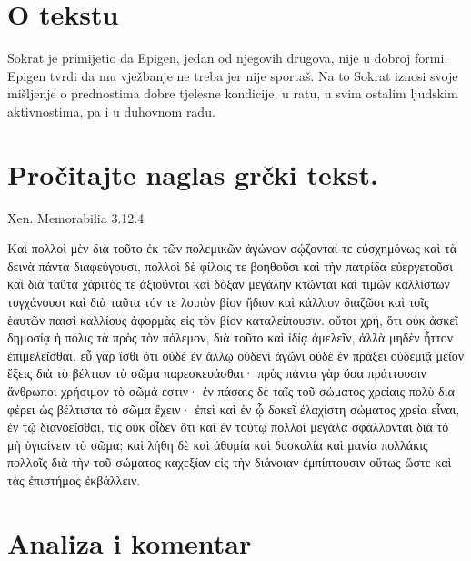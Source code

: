 


\section*{O tekstu}

Sokrat je primijetio da Epigen, jedan od njegovih drugova, nije u dobroj formi. Epigen tvrdi da mu vježbanje ne treba jer nije sportaš. Na to Sokrat iznosi svoje mišljenje o prednostima dobre tjelesne kondicije, u ratu, u svim ostalim ljudskim aktivnostima, pa i u duhovnom radu.


\section*{Pročitajte naglas grčki tekst.}
Xen. Memorabilia 3.12.4

\medskip

{\large
\begin{greek}

\noindent Καὶ πολλοὶ μὲν διὰ τοῦτο ἐκ τῶν πολεμικῶν ἀγώνων σῴζονταί τε εὐσχημόνως καὶ τὰ δεινὰ πάντα διαφεύγουσι, πολλοὶ δὲ φίλοις τε βοηθοῦσι καὶ τὴν πατρίδα εὐεργετοῦσι καὶ διὰ ταῦτα χάριτός τε ἀξιοῦνται καὶ δόξαν μεγάλην κτῶνται καὶ τιμῶν καλλίστων τυγχάνουσι καὶ διὰ ταῦτα τόν τε λοιπὸν βίον ἥδιον καὶ κάλλιον διαζῶσι καὶ τοῖς ἑαυτῶν παισὶ καλλίους ἀφορμὰς εἰς τὸν βίον καταλείπουσιν. οὔτοι χρή, ὅτι οὐκ ἀσκεῖ δημοσίᾳ ἡ πόλις τὰ πρὸς τὸν πόλεμον, διὰ τοῦτο καὶ ἰδίᾳ ἀμελεῖν, ἀλλὰ μηδὲν ἧττον ἐπιμελεῖσθαι. εὖ γὰρ ἴσθι ὅτι οὐδὲ ἐν ἄλλῳ οὐδενὶ ἀγῶνι οὐδὲ ἐν πράξει οὐδεμιᾷ μεῖον ἕξεις διὰ τὸ βέλτιον τὸ σῶμα παρεσκευάσθαι· πρὸς πάντα γὰρ ὅσα πράττουσιν ἄνθρωποι χρήσιμον τὸ σῶμά ἐστιν· ἐν πάσαις δὲ ταῖς τοῦ σώματος χρείαις πολὺ διαφέρει ὡς βέλτιστα τὸ σῶμα ἔχειν· ἐπεὶ καὶ ἐν ᾧ δοκεῖ ἐλαχίστη σώματος χρεία εἶναι, ἐν τῷ διανοεῖσθαι, τίς οὐκ οἶδεν ὅτι καὶ ἐν τούτῳ πολλοὶ μεγάλα σφάλλονται διὰ τὸ μὴ ὑγιαίνειν τὸ σῶμα; καὶ λήθη δὲ καὶ ἀθυμία καὶ δυσκολία καὶ μανία πολλάκις πολλοῖς διὰ τὴν τοῦ σώματος καχεξίαν εἰς τὴν διάνοιαν ἐμπίπτουσιν οὕτως ὥστε καὶ τὰς ἐπιστήμας ἐκβάλλειν.

\end{greek}

}

\section*{Analiza i komentar}


